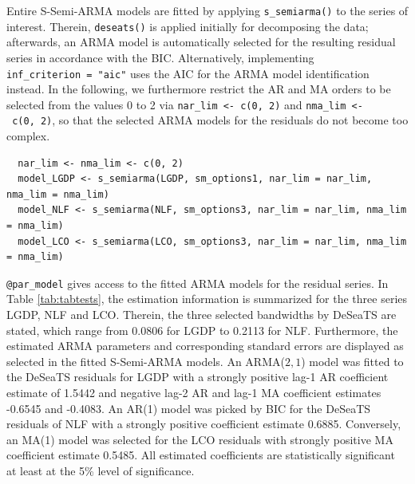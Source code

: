 Entire S-Semi-ARMA models are fitted by applying \texttt{s\_semiarma()} to the series of interest. Therein, \texttt{deseats()} is applied initially for decomposing the data; afterwards, an ARMA model is automatically selected for the resulting residual series in accordance with the BIC. Alternatively, implementing \texttt{inf\_criterion\ =\ "aic"} uses the AIC for the ARMA model identification instead. In the following, we furthermore restrict the AR and MA orders to be selected from the values 0 to 2 via \texttt{nar\_lim\ \textless{}-\ c(0,\ 2)} and \texttt{nma\_lim\ \textless{}-\ c(0,\ 2)}, so that the selected ARMA models for the residuals do not become too complex.

\begin{verbatim}
  nar_lim <- nma_lim <- c(0, 2)
  model_LGDP <- s_semiarma(LGDP, sm_options1, nar_lim = nar_lim, nma_lim = nma_lim) 
  model_NLF <- s_semiarma(NLF, sm_options3, nar_lim = nar_lim, nma_lim = nma_lim)
  model_LCO <- s_semiarma(LCO, sm_options3, nar_lim = nar_lim, nma_lim = nma_lim) 
\end{verbatim}

\noindent
\texttt{@par\_model} gives access to the fitted ARMA models for the residual series. In Table \ref{tab:tabtests}, the estimation information is summarized for the three series LGDP, NLF and LCO. Therein, the three selected bandwidths by DeSeaTS are stated, which range from 0.0806 for LGDP to 0.2113 for NLF. Furthermore, the estimated ARMA parameters and corresponding standard errors are displayed as selected in the fitted S-Semi-ARMA models. An ARMA(\(2, 1\)) model was fitted to the DeSeaTS residuals for LGDP with a strongly positive lag-1 AR coefficient estimate of 1.5442 and negative lag-2 AR and lag-1 MA coefficient estimates -0.6545 and -0.4083. An AR(1) model was picked by BIC for the DeSeaTS residuals of NLF with a strongly positive coefficient estimate 0.6885. Conversely, an MA(1) model was selected for the LCO residuals with strongly positive MA coefficient estimate 0.5485. All estimated coefficients are statistically significant at least at the 5\% level of significance.

